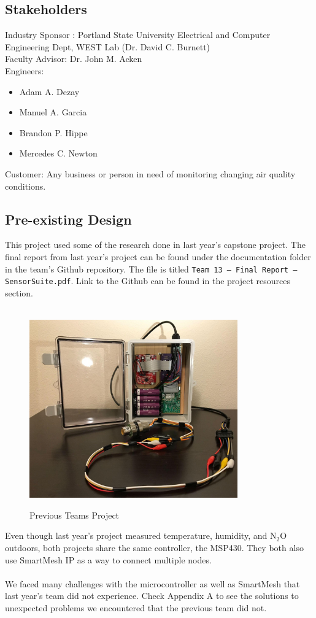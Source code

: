 \subsection{Stakeholders}
Industry Sponsor : Portland State University Electrical and Computer Engineering Dept, WEST Lab (Dr. David C. Burnett) \\
Faculty Advisor: Dr. John M. Acken\\
Engineers: \begin{itemize}
\item Adam A. Dezay
\item Manuel A. Garcia
\item Brandon P. Hippe
\item Mercedes C. Newton \\
\end{itemize}
Customer: Any business or person in need of monitoring changing air quality conditions.

\subsection{Pre-existing Design}
This project used some of the research done in last year’s capstone project. The final report from last year’s project can be found under the documentation folder in the team’s Github repository. The file is titled \texttt{Team 13 -- Final Report -- SensorSuite.pdf}. Link to the Github can be found in the project resources section.\\
\\
\begin{figure}[H]
    \centering
    \includegraphics[width=0.8\textwidth]{Pictures/prevproj.png}
    \caption[Previous Teams Project]{Previous Teams Project} 
    \cite{leon2023networked}
    \label{fig:part1commrin}
\end{figure}
Even though last year’s project measured temperature, humidity, and N$_2$O outdoors, both projects share the same controller, the MSP430. They both also use SmartMesh IP as a way to connect multiple nodes. \\
\\
We faced many challenges with the microcontroller as well as SmartMesh that last year’s team did not experience. Check Appendix A to see the solutions to unexpected problems we encountered that the previous team did not. 